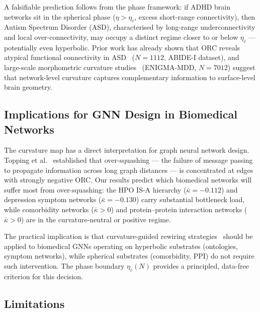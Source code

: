 \documentclass[11pt,a4paper]{article}
\newcommand{\kbar}{\bar{\kappa}}
\newcommand{\etac}{\eta_c}
\begin{document}
A falsifiable prediction follows from the phase framework: if ADHD brain networks sit in the spherical phase ($\eta > \etac$, excess short-range connectivity), then Autism Spectrum Disorder (ASD), characterised by long-range underconnectivity and local over-connectivity, may occupy a distinct regime closer to or below $\etac$ --- potentially even hyperbolic. Prior work has already shown that ORC reveals atypical functional connectivity in ASD~\cite{asd2022ricci} ($N=1112$, ABIDE-I dataset), and large-scale morphometric curvature studies~\cite{enigmamdd2025} (ENIGMA-MDD, $N=7012$) suggest that network-level curvature captures complementary information to surface-level brain geometry.

\subsection{Implications for GNN Design in Biomedical Networks}

The curvature map has a direct interpretation for graph neural network design. Topping et al.~\cite{topping2022over} established that over-squashing --- the failure of message passing to propagate information across long graph distances --- is concentrated at edges with strongly negative ORC. Our results predict which biomedical networks will suffer most from over-squashing: the HPO IS-A hierarchy ($\kbar = -0.112$) and depression symptom networks ($\kbar = -0.130$) carry substantial bottleneck load, while comorbidity networks ($\kbar > 0$) and protein--protein interaction networks ($\kbar > 0$) are in the curvature-neutral or positive regime.

The practical implication is that curvature-guided rewiring strategies~\cite{ni2019community} should be applied to biomedical GNNs operating on hyperbolic substrates (ontologies, symptom networks), while spherical substrates (comorbidity, PPI) do not require such intervention. The phase boundary $\etac(N)$ provides a principled, data-free criterion for this decision.

\subsection{Limitations}
\end{document}

